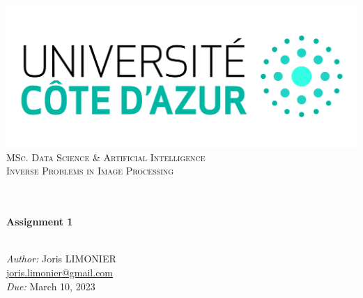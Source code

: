 \begin{titlepage}
	\begin{center}
		\includegraphics[width=\textwidth]{images/logo_uca.jpeg}\\[0.1cm]
		\vspace{1.5cm}
		\textsc{\Large MSc. Data Science \& Artificial Intelligence}\\[1.2cm]
		\textsc{\Large Inverse Problems in Image Processing}\\[1.2cm]
		\\
		\vspace{1cm}

		\HRule \\[0.6cm]
		{\huge \bfseries Assignment 1}\\[0.3cm]
		\HRule \\[1.8cm]
		\vfill

		\large
		\emph{Author:} Joris LIMONIER\\[.2cm]
		\href{mailto:joris.limonier@gmail.com}{\color{black}joris.limonier@gmail.com} \\[.2cm]
		\emph{Due:} {\large March 10, 2023}
	\end{center}
\end{titlepage}


